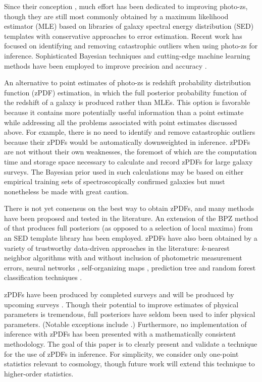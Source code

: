 \documentclass[preprint]{aastex}
\begin{document}
Since their conception \citep{bau62}, much effort has been dedicated to improving photo-zs, though they are still most commonly obtained by a maximum likelihood estimator (MLE) based on libraries of galaxy spectral energy distribution (SED) templates with conservative approaches to error estimation.  Recent work has focused on identifying and removing catastrophic outliers when using photo-zs for inference.  \citep{gor13}  Sophisticated Bayesian techniques and cutting-edge machine learning methods have been employed to improve precision \citep{car10} and accuracy \citep{sad15}. 

An alternative to point estimates of photo-zs is redshift probability distribution function (zPDF) estimation, in which the full posterior probability function of the redshift of a galaxy is produced rather than MLEs.  \citep{bud08}  This option is favorable because it contains more potentially useful information than a point estimate while addressing all the problems associated with point estimates discussed above.  For example, there is no need to identify and remove catastrophic outliers because their zPDFs would be automatically downweighted in inference.  zPDFs are not without their own weaknesses, the foremost of which are the computation time and storage space necessary to calculate and record zPDFs for large galaxy surveys.  \citep{car14b}  The Bayesian prior used in such calculations may be based on either empirical training sets of spectroscopically confirmed galaxies but must nonetheless be made with great caution.

There is not yet consensus on the best way to obtain zPDFs, and many methods have been proposed and tested in the literature.  An extension of the BPZ method of \citet{ben98} that produces full posteriors (as opposed to a selection of local maxima) from an SED template library has been employed.  \citep{hil11, kel12, lop14}  zPDFs have also been obtained by a variety of trustworthy data-driven approaches in the literature: $k$-nearest neighbor algorithms with \citep{bal08} and without \citep{she11} inclusion of photometric measurement errors, neural networks \citep{bon13}, self-organizing maps \citep{car14a}, prediction tree and random forest classification techniques \citep{car10, car13}.  

zPDFs have been produced by completed surveys \citep{hil11, she11} and will be produced by upcoming surveys \citep{abe09, car14a}.  Though their potential to improve estimates of physical parameters is tremendous, full posteriors have seldom been used to infer physical parameters.  (Notable exceptions include \citet{app12}.)  Furthermore, no implementation of inference with zPDFs has been presented with a mathematically consistent methodology.  The goal of this paper is to clearly present and validate a technique for the use of zPDFs in inference.  For simplicity, we consider only one-point statistics relevant to cosmology, though future work will extend this technique to higher-order statistics.
\end{document}
